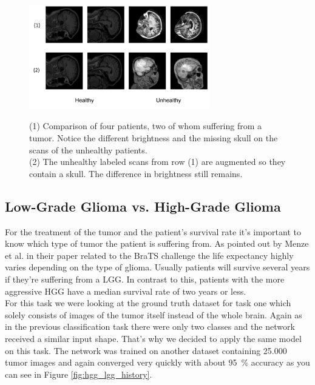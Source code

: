 \documentclass[a4paper,12pt,pagesize,headsepline,bibtotoc,titlepage]{scrartcl}
\begin{document}
\begin{figure}[t]
\begin{center}
\includegraphics*[width=0.7\textwidth]{images/healthy_unhealthy_samples_mixed.png}\\
\caption{(1) Comparison of four patients, two of whom suffering from a tumor. Notice the different brightness and the missing skull on the scans of the unhealthy patients.\\
(2) The unhealthy labeled scans from row (1) are augmented so they contain a skull. The difference in brightness still remains.}
\label{fig:healthy_samples}
\end{center}
\end{figure}


\subsection{Low-Grade Glioma vs. High-Grade Glioma}

For the treatment of the tumor and the patient's survival rate it's important to know which type of tumor the patient is suffering from.
As pointed out by Menze et al. \cite{journals/tmi/MenzeJBKFKBPSWL15} in their paper related to the BraTS challenge the life expectancy highly varies depending on the type of glioma.
Usually patients will survive several years if they're suffering from a LGG.
In contrast to this, patients with the more aggressive HGG have a median survival rate of two years or less. \\
For this task we were looking at the ground truth dataset for task one which solely consists of images of the tumor itself instead of the whole brain.
Again as in the previous classification task there were only two classes and the network received a similar input shape.
That's why we decided to apply the same model on this task.
The network was trained on another dataset containing 25.000 tumor images and again converged very quickly with about 95~\% accuracy as you can see in Figure \ref{fig:hgg_lgg_history}.
\end{document}
